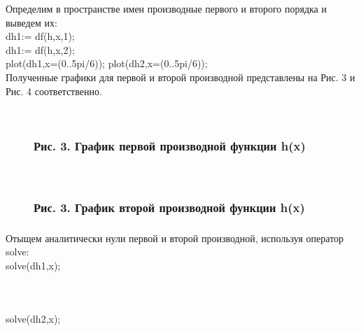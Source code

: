 \documentclass[russian,utf8,nocolumnxxxi,nocolumnxxxii]{eskdtext}
\begin{document}
Определим в пространстве имен производные первого и второго порядка и выведем их:\\
dh1:= df(h,x,1);\\
dh1:= df(h,x,2);\\
plot(dh1,x=(0..5pi/6));
\newpage
plot(dh2,x=(0..5pi/6));\\
Полученные графики для первой и второй производной представлены на Рис. 3 и Рис. 4 соответственно.
\begin{figure}[H]
\begin{center}
\begin{minipage}[h]{0.70\linewidth}
  \\
\frametitle{Рис. 3. График первой производной функции h(x)}
\frametitle{}
\end{minipage}
\end{center}
\end{figure}

\begin{figure}[H]
\begin{center}
\begin{minipage}[h]{0.70\linewidth}
  \\
\frametitle{Рис. 3. График второй производной функции h(x)}
\frametitle{}
\end{minipage}
\end{center}
\end{figure}
Отыщем аналитически нули первой и второй производной, используя оператор solve:\\
solve(dh1,x);
\newpage
\begin{figure}[H]
\begin{center}
\begin{minipage}[h]{0.70\linewidth}
  \\
\frametitle{}
\frametitle{}
\end{minipage}
\end{center}
\end{figure}
solve(dh2,x);

\begin{figure}[H]
\begin{center}
\begin{minipage}[h]{0.70\linewidth}
  \\
\frametitle{}
\frametitle{}
\end{minipage}
\end{center}
\end{figure}
\end{document}

